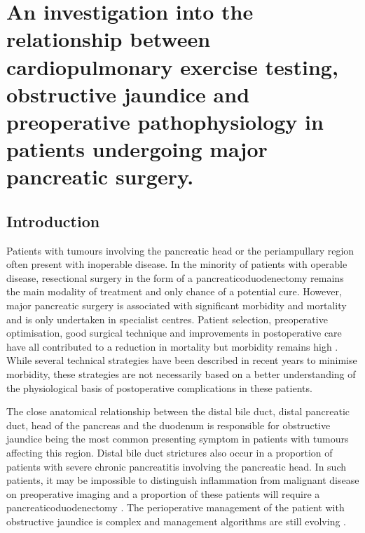 
\chapter{An investigation into the relationship between cardiopulmonary exercise testing, obstructive jaundice and preoperative pathophysiology in patients undergoing major pancreatic surgery.}

\label{ch_cpet_jaundice}
\clearpage


\section{Introduction}
Patients with tumours involving the pancreatic head or the periampullary region often present with inoperable disease. 
In the minority of patients with operable disease, resectional surgery in the form of a pancreaticoduodenectomy remains the main modality of treatment and only chance of a potential cure. 
However, major pancreatic surgery is associated with significant morbidity and mortality and is only undertaken in specialist centres. 
Patient selection, preoperative optimisation, good surgical technique and improvements in postoperative care have all contributed to a reduction in mortality \parencite{winter_1423_2006} but morbidity remains high \parencite{mann_review_2010}.
While several technical strategies have been described in recent years to minimise morbidity, these strategies are not necessarily based on a better understanding of the physiological basis of postoperative complications in these patients.

The close anatomical relationship between the distal bile duct, distal pancreatic duct, head of the pancreas and the duodenum is responsible for obstructive jaundice being the most common presenting symptom in patients with tumours affecting this region. 
Distal bile duct strictures also occur in a proportion of patients with severe chronic pancreatitis involving the pancreatic head.
In such patients, it may be impossible to distinguish inflammation from malignant disease on preoperative imaging and a proportion of these patients will require a pancreaticoduodenectomy \parencite{abraham_pancreaticoduodenectomy_2003}.
The perioperative management of the patient with obstructive jaundice is complex and management algorithms are still evolving \parencite{wang_preoperative_2008}. 

